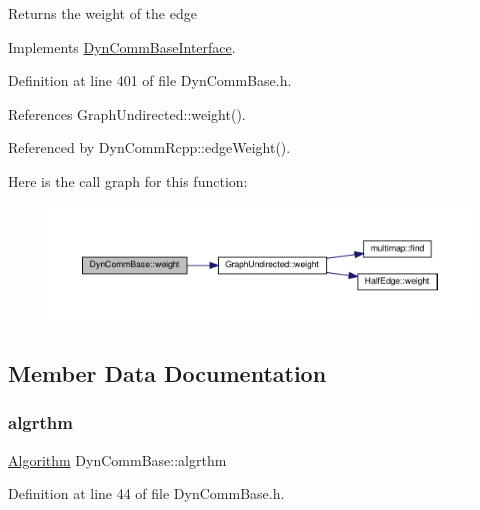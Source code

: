 \begin{DoxyReturn}{Returns}
the weight of the edge 
\end{DoxyReturn}


Implements \hyperlink{classDynCommBaseInterface_a31514affa49ac05ccf3318b3558cf0b2}{Dyn\+Comm\+Base\+Interface}.



Definition at line 401 of file Dyn\+Comm\+Base.\+h.



References Graph\+Undirected\+::weight().



Referenced by Dyn\+Comm\+Rcpp\+::edge\+Weight().

Here is the call graph for this function\+:
\nopagebreak
\begin{figure}[H]
\begin{center}
\leavevmode
\includegraphics[width=350pt]{classDynCommBase_ae48a572da3c7b375429e96e717b15787_cgraph}
\end{center}
\end{figure}


\subsection{Member Data Documentation}
\mbox{\label{classDynCommBase_a966f54b7ba340fa782146659998760ed}} 
\subsubsection{\texorpdfstring{algrthm}{algrthm}}
{\footnotesize\ttfamily \hyperlink{classAlgorithm}{Algorithm} Dyn\+Comm\+Base\+::algrthm\hspace{0.3cm}{\ttfamily [private]}}



Definition at line 44 of file Dyn\+Comm\+Base.\+h.

\mbox{\label{classDynCommBase_ae79d443436131554acb4b3ed24908701}} 

